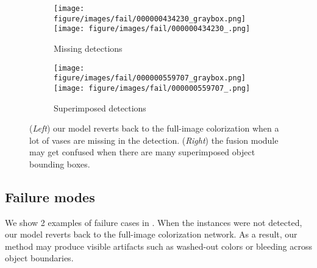 \begin{figure}[!t]
    \begin{subfigure}[!t]{.34\linewidth}
       \texttt{[image: figure/images/fail/000000434230\_graybox.png]}
       \texttt{[image: figure/images/fail/000000434230\_.png]}
       \caption{{Missing detections}}
    \end{subfigure}
    \begin{subfigure}[!t]{.65\linewidth}
       \texttt{[image: figure/images/fail/000000559707\_graybox.png]}
       \texttt{[image: figure/images/fail/000000559707\_.png]}
       \caption{{Superimposed detections}}
    \end{subfigure}
    \caption{ (\emph{Left}) our model reverts back to the full-image colorization when a lot of vases are missing in the detection. (\emph{Right}) the fusion module may get confused when there are many superimposed object bounding boxes.
    }
    \label{fig:failure}
\end{figure} 
\subsection{Failure modes}
\label{sec:failure}

We show 2 examples of failure cases in . 
When the instances were not detected, our model reverts back to the full-image colorization network.
As a result, our method may produce visible artifacts such as washed-out colors or bleeding across object boundaries.


